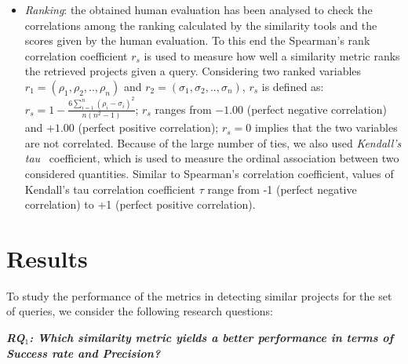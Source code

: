 \begin{itemize}
	\item \textit{Ranking}: the obtained human evaluation has been analysed to check the correlations among the ranking calculated by the similarity tools and the scores given by the human evaluation. To this end the Spearman's rank correlation coefficient $r_{s}$ \cite{spearman1904proof} is used to measure how well a similarity metric ranks the retrieved projects given a query. Considering two ranked variables $r_{1}=(\rho_{1},\rho_{2},..,\rho_{n})$ and $r_{2}=(\sigma_{1},\sigma_{2},..,\sigma_{n})$, $r_{s}$ is defined as: $r_{s}=1-\frac{6\sum_{i=1}^{n} (\rho_{i}-\sigma_{i})^{2}}{n(n^{2}-1)}$; $r_{s}$ ranges from $-1.00$ (perfect negative correlation) and $+1.00$ (perfect positive correlation); $r_{s}=0$ implies that the two variables are not correlated. Because of the large number of ties, we also used \emph{Kendall's tau}~\cite{kendall1948rank} coefficient, which is used to measure the ordinal association between two considered quantities. Similar to Spearman's correlation coefficient, values of Kendall's tau correlation coefficient $\tau$ range from -1 (perfect negative correlation) to +1 (perfect positive correlation).
\end{itemize}	





\section{Results} \label{sec:Results}

To study the performance of the metrics in detecting similar projects for the set of queries, we consider the following research questions:%

\newcommand{\rqfirst}{RQ$_1$: Which similarity metric yields a better performance in terms of Success rate and Precision?}\textit{\textbf{\rqfirst}} 

